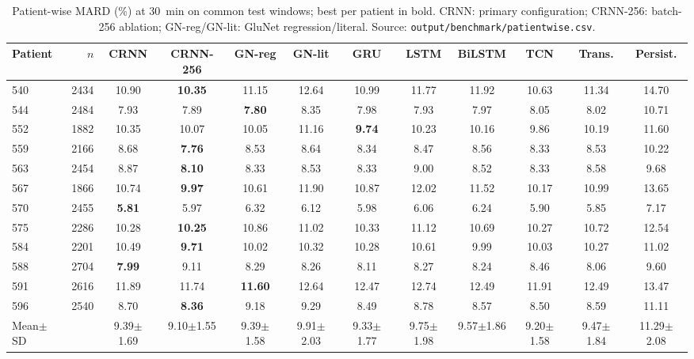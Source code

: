 \begin{table}[t]\centering
\caption{Patient-wise MARD (\%) at 30~min on common test windows; best per patient in bold. CRNN: primary configuration; CRNN-256: batch-256 ablation; GN-reg/GN-lit: GluNet regression/literal. Source: \texttt{output/benchmark/patientwise.csv}.}
\scriptsize\setlength{\tabcolsep}{3pt}
\begin{tabular}{lrcccccccccc}\toprule
Patient & $n$ & CRNN & CRNN-256 & GN-reg & GN-lit & GRU & LSTM & BiLSTM & TCN & Trans. & Persist.\\\midrule
540 & 2434 & 10.90 & \textbf{10.35} & 11.15 & 12.64 & 10.99 & 11.77 & 11.92 & 10.63 & 11.34 & 14.70\\
544 & 2484 & 7.93 & 7.89 & \textbf{7.80} & 8.35 & 7.98 & 7.93 & 7.97 & 8.05 & 8.02 & 10.71\\
552 & 1882 & 10.35 & 10.07 & 10.05 & 11.16 & \textbf{9.74} & 10.23 & 10.16 & 9.86 & 10.19 & 11.60\\
559 & 2166 & 8.68 & \textbf{7.76} & 8.53 & 8.64 & 8.34 & 8.47 & 8.56 & 8.33 & 8.53 & 10.22\\
563 & 2454 & 8.87 & \textbf{8.10} & 8.33 & 8.53 & 8.33 & 9.00 & 8.52 & 8.33 & 8.58 & 9.68\\
567 & 1866 & 10.74 & \textbf{9.97} & 10.61 & 11.90 & 10.87 & 12.02 & 11.52 & 10.17 & 10.99 & 13.65\\
570 & 2455 & \textbf{5.81} & 5.97 & 6.32 & 6.12 & 5.98 & 6.06 & 6.24 & 5.90 & 5.85 & 7.17\\
575 & 2286 & 10.28 & \textbf{10.25} & 10.86 & 11.02 & 10.33 & 11.12 & 10.69 & 10.27 & 10.72 & 12.54\\
584 & 2201 & 10.49 & \textbf{9.71} & 10.02 & 10.32 & 10.28 & 10.61 & 9.99 & 10.03 & 10.27 & 11.02\\
588 & 2704 & \textbf{7.99} & 9.11 & 8.29 & 8.26 & 8.11 & 8.27 & 8.24 & 8.46 & 8.06 & 9.60\\
591 & 2616 & 11.89 & 11.74 & \textbf{11.60} & 12.64 & 12.47 & 12.74 & 12.49 & 11.91 & 12.49 & 13.47\\
596 & 2540 & 8.70 & \textbf{8.36} & 9.18 & 9.29 & 8.49 & 8.78 & 8.57 & 8.50 & 8.59 & 11.11\\
\midrule
Mean$\pm$SD & & 9.39$\pm$1.69 & 9.10$\pm$1.55 & 9.39$\pm$1.58 & 9.91$\pm$2.03 & 9.33$\pm$1.77 & 9.75$\pm$1.98 & 9.57$\pm$1.86 & 9.20$\pm$1.58 & 9.47$\pm$1.84 & 11.29$\pm$2.08\\
\bottomrule
\end{tabular}\end{table}
